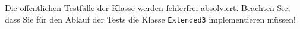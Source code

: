 Die \"offentlichen Testf\"alle der Klasse \texttt{\testLvC} werden
fehlerfrei absolviert. Beachten Sie, dass Sie f\"ur den Ablauf der Tests
die Klasse \texttt{\testAdapter{}Extended3} implementieren m\"ussen!
